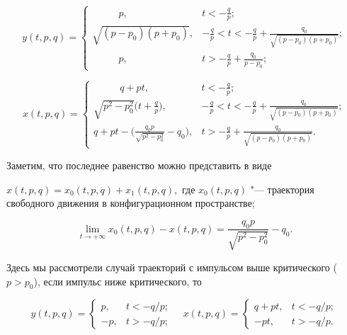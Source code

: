 $$y(t,p,q)=

\begin{cases}

~~~~~~~~~~~~p, & t< - \frac q p;\\

\sqrt{(p-p_0)(p+p_0)}, &- \frac qp < t<- \frac qp + \frac{q_0}{\sqrt{(p-p_0)(p+p_0)}};\\

~~~~~~~~~~~~p, & t >- \frac qp + \frac{q_0}{p-p_0};

\end{cases}$$

$$x(t,p,q)=

\begin{cases}

~~~~~~~~~~~~q+pt , & t< - \frac qp;\\

\sqrt{p^2-p^2_0}\bigl(t+\frac qp \bigr), &  - \frac qp < t<- \frac qp + \frac{q_0}{\sqrt{(p-p_0)(p+p_0)}};\\

q+pt -\bigl(\frac{q_0p}{\sqrt{p^2-p^2_0}}-q_0 \bigr), & t >- \frac qp + \frac{q_0}{\sqrt{(p-p_0)(p+p_0)}}.

\end{cases}$$

 Заметим, что последнее равенство можно представить в виде 

 $x(t,p,q) = x_0(t,p,q) + x_1(t,p,q),$ где $x_0(t,p,q)$ "--- траектория свободного движения в конфигурационном пространстве;

$$

\lim_{t\rightarrow+\infty}x_0(t,p,q)-x(t,p,q)=\frac{q_0p}{\sqrt{p^2-p^2_0}}-q_0.

$$

 Здесь мы рассмотрели случай траекторий с импульсом выше критического ($p>p_0$), если импульс ниже критического, то

$$y(t,p,q)=

\begin{cases}

p, & t< -q/p;\\

-p, & t >-q/p;

\end{cases} \quad 

x(t,p,q)=

\begin{cases}

q+pt, & t< -q/p;\\

-pt , & t >-q/p.

\end{cases}$$



